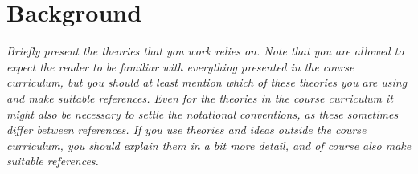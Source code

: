 \section{Background}
\label{sec:background}

\textit{Briefly present the theories that you work relies on. Note that you are allowed to expect the reader to be familiar with everything presented in the course curriculum, but you should at least mention which of these theories you are using and make suitable references. Even for the theories in the course curriculum it might also be necessary to settle the notational conventions, as these sometimes differ between references. If you use theories and ideas outside the course curriculum, you should explain them in a bit more detail, and of course also make suitable references.}